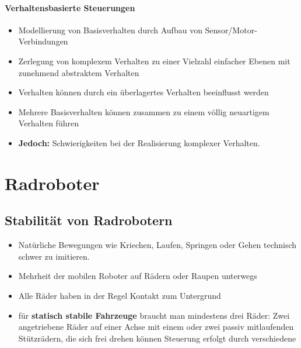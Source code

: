\paragraph{Verhaltensbasierte Steuerungen}
\begin{itemize}
	\item Modellierung von Basisverhalten durch Aufbau von Sensor/Motor-Verbindungen
	\item Zerlegung von komplexem Verhalten zu einer Vielzahl einfacher Ebenen mit zunehmend abstraktem Verhalten
	\item Verhalten können durch ein überlagertes Verhalten beeinflusst werden
	\item Mehrere Basisverhalten können zusammen zu einem völlig neuartigem Verhalten führen
	\item \textbf{Jedoch:} Schwierigkeiten bei der Realisierung komplexer Verhalten.
\end{itemize}
\section{Radroboter}
\subsection{Stabilität von Radrobotern}
\begin{itemize}
	\item Natürliche Bewegungen wie Kriechen, Laufen, Springen oder Gehen technisch schwer zu imitieren.
	\item Mehrheit der mobilen Roboter auf Rädern oder Raupen unterwegs
	\item Alle Räder haben in der Regel Kontakt zum Untergrund
	\item für \textbf{statisch stabile Fahrzeuge} braucht man mindestens drei Räder:
	\subitem Zwei angetriebene Räder auf einer Achse mit einem oder zwei passiv mitlaufenden Stützrädern, die sich frei drehen können
	\subitem Steuerung erfolgt durch verschiedene

\end{itemize}








	








